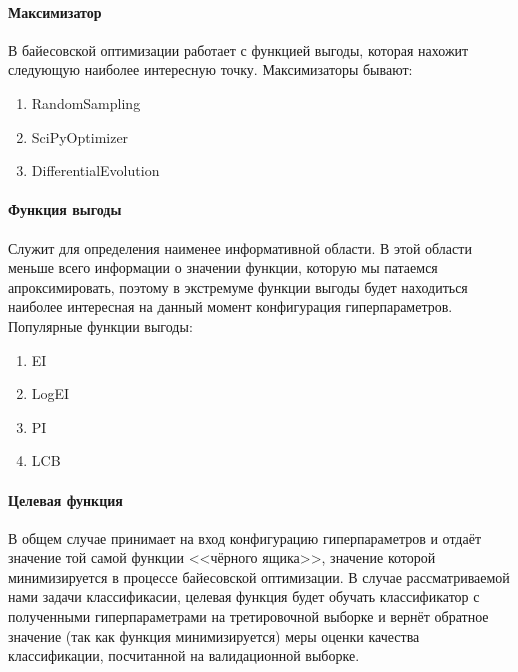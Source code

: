 \documentclass[times,specification,annotation]{itmo-student-thesis}
\begin{document}
	\paragraph{Максимизатор} В байесовской оптимизации работает с функцией выгоды, которая нахожит следующую наиболее интересную точку. Максимизаторы бывают:
	\begin{enumerate}
		\item RandomSampling
		\item SciPyOptimizer
		\item DifferentialEvolution
	\end{enumerate}
	\paragraph{Функция выгоды} Служит для определения наименее информативной области. В этой области меньше всего информации о значении функции, которую мы патаемся апроксимировать, поэтому в экстремуме функции выгоды будет находиться наиболее интересная на данный момент конфигурация гиперпараметров. Популярные функции выгоды:
	\begin{enumerate}
		\item EI
		\item LogEI
		\item PI
		\item LCB
	\end{enumerate}
	\paragraph{Целевая функция} В общем случае принимает на вход конфигурацию гиперпараметров и отдаёт значение той самой функции <<чёрного ящика>>\cite{koh2017understanding}, значение которой минимизируется в процессе байесовской оптимизации. В случае рассматриваемой нами задачи классификасии, целевая функция будет обучать классификатор с полученными гиперпараметрами на третировочной выборке и вернёт обратное значение (так как функция минимизируется) меры оценки качества классификации, посчитанной на валидационной выборке. \label{pr:objf}
	\finishrelatedwork
	
\end{document}

